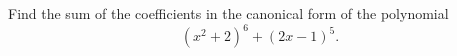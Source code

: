 Find the sum of the coefficients in the canonical form of the polynomial \[(x^{2}+2)^{6}+(2x-1)^{5}.\]
